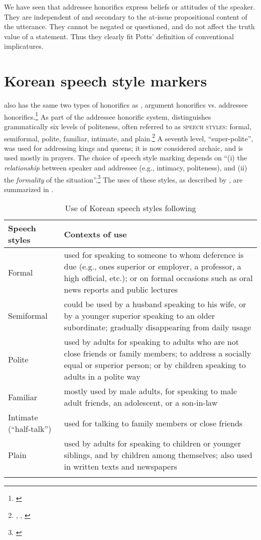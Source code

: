 We have seen that addressee honorifics express beliefs or attitudes of the speaker. They are independent of and secondary to the at-issue propositional content of the utterance. They cannot be negated or questioned, and do not affect the truth value of a statement. Thus they clearly fit Potts’ definition of conventional implicatures.


\section{Korean speech style markers}\label{sec:11.4}

 also has the same two types of honorifics as , argument honorifics vs. addressee honorifics.\footnote{\citet{KimSells2007}} As part of the addressee honorific system,  distinguishes grammatically six levels of politeness, often referred to as \textsc{speech styles}: formal, semiformal, polite, familiar, intimate, and plain.\footnote{\citet{Martin1992}, \citet{Pak2008}, \citet{Sohn1999}} A seventh level, “super-polite”, was used for addressing kings and queens; it is now considered archaic, and is used mostly in prayers. The choice of speech style marking depends on “(i) the \textit{relationship} between speaker and addressee (e.g., intimacy, politeness), and (ii) the \textit{formality} of the situation”.\footnote{\citet{PakEtAl2013}} The uses of these styles, as described by \citet[120]{Pak2008}, are summarized in .

\begin{table}
 \caption{Use of Korean speech styles following \citet[120]{Pak2008}}

\label{extab:11.22}
\begin{tabularx}{\textwidth}{L{2.5cm}Q}
\lsptoprule
 Speech styles & Contexts of use\\
 \midrule
 Formal & used for speaking to someone to whom deference is due (e.g., ones superior or employer, a professor, a high official, etc.); or on formal occasions such as oral news reports and public lectures\\
 \tablevspace
 Semiformal & could be used by a husband speaking to his wife, or by a younger superior speaking to an older subordinate; gradually disappearing from daily usage\\
  \tablevspace
 Polite & used by adults for speaking to adults who are not close friends or family members; to address a socially equal or superior person; or by children speaking to adults in a polite way\\
  \tablevspace
 Familiar & mostly used by male adults, for speaking to male adult friends, an adolescent, or a son-in-law\\
 \tablevspace
 Intimate (“half-talk”) & used for talking to family members or close friends\\
 \tablevspace
 Plain & used by adults for speaking to children or younger siblings, and by children among themselves; also used in written texts and newspapers\\
\lspbottomrule
\end{tabularx}
\end{table}

